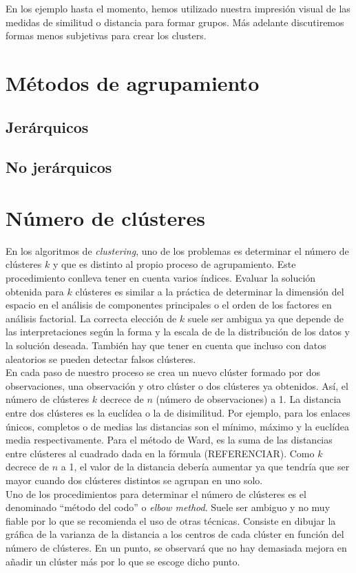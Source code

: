\documentclass[a4paper, 20pt]{article}
\begin{document}
En los ejemplo hasta el momento, hemos utilizado nuestra impresión visual de las medidas de similitud o distancia para formar grupos. Más adelante discutiremos formas menos subjetivas para crear los clusters. 

\section{Métodos de agrupamiento}
\subsection{Jerárquicos}
\subsection{No jerárquicos}
\section{Número de clústeres}
En los algoritmos de \textit{clustering}, uno de los problemas es determinar el número de clústeres $ k $ y que es distinto al propio proceso de agrupamiento. Este procedimiento conlleva tener en cuenta varios índices. Evaluar la solución obtenida para $ k $ clústeres es similar a la práctica de determinar la dimensión del espacio en el análisis de componentes principales o el orden de los factores en análisis factorial.
La correcta elección de $ k $ suele ser ambigua ya que depende de las interpretaciones según la forma y la escala de de la distribución de los datos y la solución deseada. También hay que tener en cuenta que incluso con datos aleatorios se pueden detectar falsos clústeres. \\

En cada paso de nuestro proceso se crea un nuevo clúster formado por dos observaciones, una observación y otro clúster o dos clústeres ya obtenidos. Así, el número de clústeres $ k $ decrece de $ n $ (número de observaciones) a 1. La distancia entre dos clústeres es la euclídea o la de disimilitud. Por ejemplo, para los enlaces únicos, completos o de medias las distancias son el mínimo, máximo y la euclídea media respectivamente. Para el método de Ward, es la suma de las distancias entre clústeres al cuadrado dada en la fórmula (REFERENCIAR). Como $ k $ decrece de $ n $ a 1, el valor de la distancia debería aumentar ya que tendría que ser mayor cuando dos clústeres distintos se agrupan en uno solo. \\

Uno de los procedimientos para determinar el número de clústeres es el denominado ``método del codo'' o \textit{elbow method}. Suele ser ambiguo y no muy fiable por lo que se recomienda el uso de otras técnicas. Consiste en dibujar la gráfica de la varianza de la distancia a los centros de cada clúster en función del número de clústeres. En un punto, se observará que no hay demasiada mejora en añadir un clúster más por lo que se escoge dicho punto. \\
\end{document}
